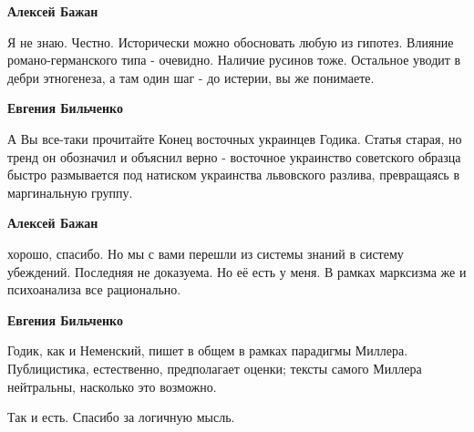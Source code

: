 \begin{itemize}
\begin{itemize}
\textbf{Алексей Бажан} 

Я не знаю. Честно. Исторически можно обосновать любую из гипотез. Влияние
романо-германского типа - очевидно. Наличие русинов тоже. Остальное уводит в
дебри этногенеза, а там один шаг - до истерии, вы же понимаете.


 
\textbf{Евгения Бильченко} 

А Вы все-таки прочитайте Конец восточных украинцев Годика. Статья старая, но
тренд он обозначил и объяснил верно - восточное украинство советского образца
быстро размывается под натиском украинства львовского разлива, превращаясь в
маргинальную группу.

 
\textbf{Алексей Бажан} 

хорошо, спасибо. Но мы с вами перешли из системы знаний в систему убеждений.
Последняя не доказуема. Но её есть у меня. В рамках марксизма же и психоанализа
все рационально.


 
\textbf{Евгения Бильченко} 

Годик, как и Неменский, пишет в общем в рамках парадигмы Миллера. Публицистика,
естественно, предполагает оценки; тексты самого Миллера нейтральны, насколько
это возможно.

\end{itemize}

 
Так и есть. Спасибо за логичную мысль.


\end{itemize}
